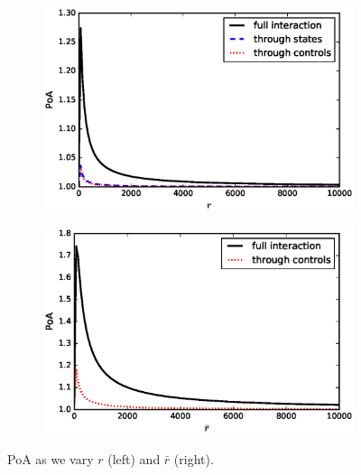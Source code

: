 \documentclass[11pt]{article}
\begin{document}
\begin{figure}[!htb]
    \centering
    \begin{subfigure}{.45\textwidth}
        \includegraphics[scale=0.5]{PoA_half_more_steps_r.eps}
    \end{subfigure}
    \begin{subfigure}{.45\textwidth}
        \includegraphics[scale=0.5]{PoA_half_more_steps_rbar.eps}
    \end{subfigure}
    \caption{PoA as we vary $r$ (left) and $\bar{r}$ (right).}
    \label{fig:r_rbar}
\end{figure}
\end{document}
